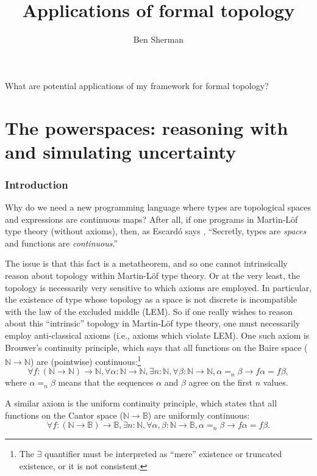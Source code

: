 \documentclass{article}           %
\title{Applications of formal topology}
\author{Ben Sherman}
\newcommand{\nat}{\mathbb{N}}
\newcommand{\bool}{\mathbb{B}}
\begin{document}
\maketitle

What are potential applications of my framework for formal topology?

\section{The powerspaces: reasoning with and simulating uncertainty}

\subsubsection{Introduction}

Why do we need a new programming language where types are topological spaces and expressions are continuous maps? After all, if one programs in Martin-Löf type theory (without axioms), then, as Escardó says \cite{escardo4wft}, ``Secretly, types are \emph{spaces} and functions are \emph{continuous}.''

The issue is that this fact is a metatheorem, and so one cannot intrinsically reason about topology within Martin-Löf type theory. Or at the very least, the topology is necessarily very sensitive to which axioms are employed. In particular, the existence of type whose topology as a space is not discrete is incompatible with the law of the excluded middle (LEM). So if one really wishes to reason about this ``intrinsic'' topology in Martin-Löf type theory, one must necessarily employ anti-classical axioms (i.e., axioms which violate LEM). One such axiom is Brouwer's continuity principle, which says that all functions on the Baire space ($\nat \to \nat$) are (pointwise) continuous:\footnote{The $\exists$ quantifier must be interpreted as ``mere'' existence or truncated existence, or it is not consistent\cite{escardo2015inconsistency}.}
\[
\forall f : (\nat \to \nat) \to \nat, 
\forall \alpha : \nat \to \nat,
\exists n : \nat,
\forall \beta : \nat \to \nat,
\alpha =_n \beta
\to
f \alpha = f \beta,
\]
where $\alpha =_n \beta$ means that the sequences $\alpha$ and $\beta$ agree on the first $n$ values.

A similar axiom is the uniform continuity principle, which states that all functions on the Cantor space ($\nat \to \bool$) are uniformly continuous:
\[
\forall f : (\nat \to \bool) \to \bool,
\exists n : \nat,
\forall \alpha, \beta : \nat \to \bool,
\alpha =_n \beta
\to
f \alpha = f \beta.
\]
\end{document}

